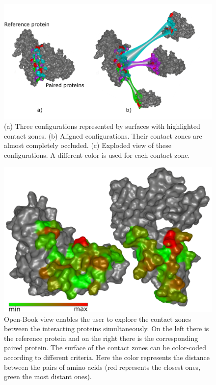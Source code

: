 \documentclass{bmcart}
\def\OpBook {Open-Book view\xspace}
\def\ExpView {Exploded view\xspace}
\begin{document}
\begin{backmatter}
\begin{figure}[h!]
    \centering
    \includegraphics[width=0.9\columnwidth]{images/figure5.pdf}
    \caption{
    (a) Three configurations represented by surfaces with highlighted contact zones. (b) Aligned configurations. Their contact zones are almost completely occluded. (c) \ExpView of these configurations. A different color is used for each contact zone.}
	\label{fig:case12}
\end{figure}

\begin{figure}[h!]
  \centering
  \includegraphics[width=0.9\columnwidth]{images/figure6.pdf}
  \caption{\csentence{\OpBook.} \OpBook enables the user to explore the contact zones between the interacting proteins simultaneously. On the left there is the reference protein and on the right there is the corresponding paired protein. The surface of the contact zones can be color-coded according to different criteria. Here the color represents the distance between the pairs of amino acids (red represents the closest ones, green the most distant ones).}
  \label{fig:book}
\end{figure}


\end{backmatter}
\end{document}
